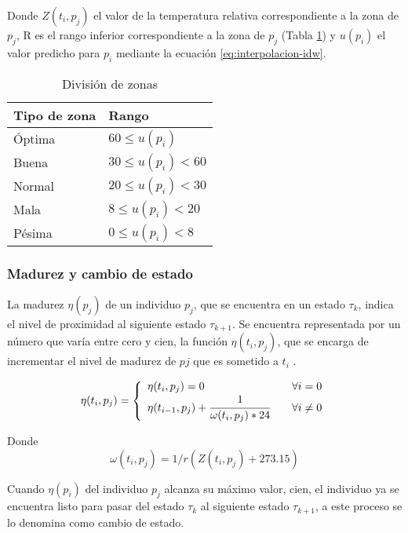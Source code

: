 Donde $Z (t_{i}, p_{j})$ el valor de la temperatura relativa correspondiente a la zona de $p_{j}$, R es el rango
inferior correspondiente a la zona de $p_{j}$ (Tabla \ref{tab:puntaje-zona}) y $u(p_{i})$ el valor predicho para 
$p_{i}$ mediante la ecuación \eqref{eq:interpolacion-idw}.

\begin{table}
\centering
    \label{tab:puntaje-zona}
    \begin{tabular}{p{3cm} p{3cm}}
        Tipo de zona & Rango \\
        \hline
        Óptima & $60 \leq u(p_{i})$ \\
        Buena  & $30 \leq u(p_{i}) < 60 $  \\
        Normal & $20 \leq u(p_{i}) < 30$\\
        Mala   & $8  \leq u(p_{i}) < 20$\\
        Pésima &  $0 \leq u(p_{i}) < 8 $ \\
    \end{tabular}
    \caption{División de zonas}
\end{table}


\subsubsection{Madurez y cambio de estado}
La madurez $\eta (p_{j})$ de un individuo $p_{j}$, que se encuentra en un estado $\tau_{k}$, indica el nivel de
proximidad al siguiente estado $\tau_{k+1}$. Se encuentra representada por un número que varía entre
cero y cien, la función $\eta (t_{i}, p_{j})$, que se encarga de incrementar el nivel de madurez de $p{j}$
que es sometido a $t_{i}$ .

\begin{equation}
\eta (t_{i}, p_{j}) = \left\{
  \begin{array}{l l}
    \eta (t_{i}, p_{j}) = 0 & \quad \forall i = 0 \\
    \eta (t_{i-1},p_{j}) + \cfrac{1}{\omega(t_{i}, p_{j}) * 24} & \quad \forall i \neq 0
  \end{array} \right.
\end{equation}

Donde 
\begin{equation}
    \omega(t_{i}, p_{j}) = 1/r(Z(t_{i}, p_{j}) + 273.15)
\end{equation}

Cuando $\eta(p_{i})$ del individuo $p_{j}$ alcanza su máximo valor, cien, el individuo ya se encuentra listo para
pasar del estado $\tau_{k}$ al siguiente estado $\tau_{k+1}$, a este proceso se lo denomina como cambio de estado.

